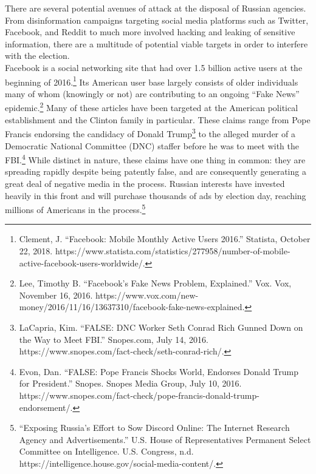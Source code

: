 \documentclass[10pt, letterpaper]{article}
\begin{document}
There are several potential avenues of attack at the disposal of Russian
agencies. From disinformation campaigns targeting social media platforms
such as Twitter, Facebook, and Reddit to much more involved hacking and
leaking of sensitive information, there are a multitude of potential
viable targets in order to interfere with the election. \\

Facebook is a social networking site that had over 1.5 billion active
users at the beginning of 2016.\footnote{Clement, J. ``Facebook: Mobile
  Monthly Active Users 2016.'' Statista, October 22, 2018.
  https://www.statista.com/statistics/277958/number-of-mobile-active-facebook-users-worldwide/.}
Its American user base largely consists of older individuals many of
whom (knowingly or not) are contributing to an ongoing ``Fake News''
epidemic.\footnote{Lee, Timothy B. ``Facebook's Fake News Problem,
  Explained.'' Vox. Vox, November 16, 2016.
  https://www.vox.com/new-money/2016/11/16/13637310/facebook-fake-news-explained.}
Many of these articles have been targeted at the American political
establishment and the Clinton family in particular. These claims range
from Pope Francis endorsing the candidacy of Donald Trump\footnote{LaCapria,
  Kim. ``FALSE: DNC Worker Seth Conrad Rich Gunned Down on the Way to
  Meet FBI.'' Snopes.com, July 14, 2016.
  https://www.snopes.com/fact-check/seth-conrad-rich/.} to the alleged
murder of a Democratic National Committee (DNC) staffer before he was to
meet with the FBI.\footnote{Evon, Dan. ``FALSE: Pope Francis Shocks
  World, Endorses Donald Trump for President.'' Snopes. Snopes Media
  Group, July 10, 2016.
  https://www.snopes.com/fact-check/pope-francis-donald-trump-endorsement/.}
While distinct in nature, these claims have one thing in common: they
are spreading rapidly despite being patently false, and are consequently
generating a great deal of negative media in the process. Russian
interests have invested heavily in this front and will purchase
thousands of ads by election day, reaching millions of Americans in the
process.\footnote{``Exposing Russia's Effort to Sow Discord Online: The
  Internet Research Agency and Advertisements.'' U.S. House of
  Representatives Permanent Select Committee on Intelligence. U.S.
  Congress, n.d. https://intelligence.house.gov/social-media-content/.} \\
\end{document}
